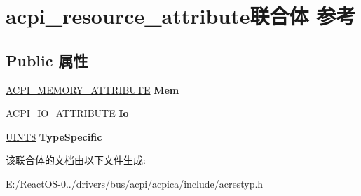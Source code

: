 \hypertarget{unionacpi__resource__attribute}{}\section{acpi\+\_\+resource\+\_\+attribute联合体 参考}
\label{unionacpi__resource__attribute}
\subsection*{Public 属性}
\begin{DoxyCompactItemize}
\item 
\mbox{\label{unionacpi__resource__attribute_ae32d8211a50664c16599029c2e88bae4}} 
\hyperlink{structacpi__memory__attribute}{A\+C\+P\+I\+\_\+\+M\+E\+M\+O\+R\+Y\+\_\+\+A\+T\+T\+R\+I\+B\+U\+TE} {\bfseries Mem}
\item 
\mbox{\label{unionacpi__resource__attribute_ae4b84d6aab36793fdaca58d25caa93a1}} 
\hyperlink{structacpi__io__attribute}{A\+C\+P\+I\+\_\+\+I\+O\+\_\+\+A\+T\+T\+R\+I\+B\+U\+TE} {\bfseries Io}
\item 
\mbox{\label{unionacpi__resource__attribute_ac2903c0c78aa47f6ea2ee3110797a33b}} 
\hyperlink{_processor_bind_8h_ab27e9918b538ce9d8ca692479b375b6a}{U\+I\+N\+T8} {\bfseries Type\+Specific}
\end{DoxyCompactItemize}


该联合体的文档由以下文件生成\+:\begin{DoxyCompactItemize}
\item 
E\+:/\+React\+O\+S-\/0../drivers/bus/acpi/acpica/include/acrestyp.\+h\end{DoxyCompactItemize}
